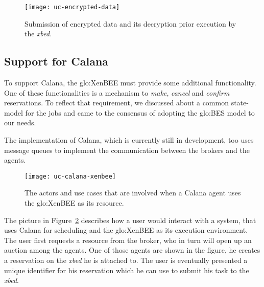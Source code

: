 \begin{figure}[h!]
  \centering
  \texttt{[image: uc-encrypted-data]}
  \caption[UC  Encrypted  Data]{Submission   of  encrypted  data  and  its
    decryption prior execution by the \emph{xbed}.}
  \label{fig:uc-encrypt-data}
\end{figure}

\subsection{Support for Calana}
\label{sec:calana-support}

To  support  Calana, the  \gls{glo:XenBEE}  must  provide some  additional
functionality. One of these functionalities is a mechanism to \emph{make},
\emph{cancel}   and   \emph{confirm}   reservations.   To   reflect   that
requirement, we discussed about a common state-model for the jobs and came
to the consensus of adopting the \gls{glo:BES} model to our needs.

The implementation of Calana, which is currently still in development, too
uses message queues to implement the communication between the brokers and
the agents.

\begin{figure}[htbp]
  \centering
  \texttt{[image: uc-calana-xenbee]}
  \caption[Calana and  XenBEE]{The actors and use cases  that are involved
    when a Calana agent uses the \gls{glo:XenBEE} as its resource.}
  \label{fig:calana-xenbee}
\end{figure}

The picture  in Figure~\ref{fig:calana-xenbee} describes how  a user would
interact  with  a  system,  that   uses  Calana  for  scheduling  and  the
\gls{glo:XenBEE} as  its execution environment. The user  first requests a
resource from  the broker, who in turn  will open up an  auction among the
agents.   One of  those  agents are  shown  in the  figure,  he creates  a
reservation on the \emph{xbed} he  is attached to.  The user is eventually
presented  a unique identifier  for his  reservation which  he can  use to
submit his task to the \emph{xbed}.

